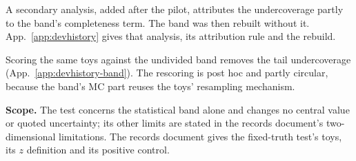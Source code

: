 

A secondary analysis, added after the pilot, attributes the undercoverage partly to the band's completeness term. The band was then rebuilt without it. App.~\ref{app:devhistory} gives that analysis, its attribution rule and the rebuild.

Scoring the same toys against the undivided band removes the tail undercoverage (App.~\ref{app:devhistory-band}). The rescoring is post hoc and partly circular, because the band's MC part reuses the toys' resampling mechanism.


\textbf{Scope.} The test concerns the statistical band alone and changes no central value or quoted uncertainty; its other limits are stated in the records document's two-dimensional limitations. The records document gives the fixed-truth test's toys, its $z$ definition and its positive control.

